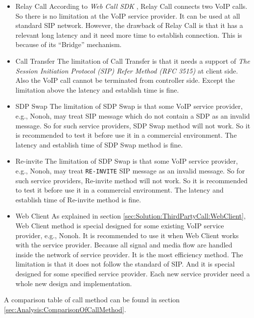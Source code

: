 \begin{itemize}
\item \textsf{Relay Call} According to \textit{Web Call SDK} \cite{WebCallSDK}, Relay Call connects two VoIP calls. So there is no limitation at the VoIP service provider. It can be used at all standard SIP network. However, the drawback of Relay Call is that it has a relevant long latency and it need more time to establish connection. This is because of its ``Bridge'' mechanism.

\item \textsf{Call Transfer} The limitation of Call Transfer is that it needs a support of \textit{The Session Initiation Protocol (SIP) Refer Method (RFC 3515)}\cite{RFC3515} at client side. Also the VoIP call cannot be terminated from controller side. Except the limitation above the latency and establish time is fine.

\item \textsf{SDP Swap} The limitation of SDP Swap is that some VoIP service provider, e.g., \textsf{Nonoh}, may treat SIP message which do not contain a SDP as an invalid message. So for such service providers, SDP Swap method will not work. So it is recommended to test it before use it in a commercial environment. The latency and establish time of SDP Swap method is fine.

\item Re-invite The limitation of SDP Swap is that some VoIP service provider, e.g., \textsf{Nonoh}, may treat \texttt{RE-INVITE} SIP message as an invalid message. So for such service providers, Re-invite method will not work. So it is recommended to test it before use it in a commercial environment. The latency and establish time of Re-invite method is fine.

\item Web Client As explained in section \ref{sec:Solution:ThirdPartyCall:WebClient}, Web Client method is special designed for some existing VoIP service provider, e.g., \textsf{Nonoh}. It is recommended to use it when Web Client works with the service provider. Because all signal and media flow are handled inside the network of service provider. It is the most efficiency method. The limitation is that it does not follow the standard of SIP. And it is special designed for some specified service provider. Each new service provider need a whole new design and implementation.

\end{itemize}

A comparison table of call method can be found in section \ref{sec:Analysis:ComparisonOfCallMethod}.


